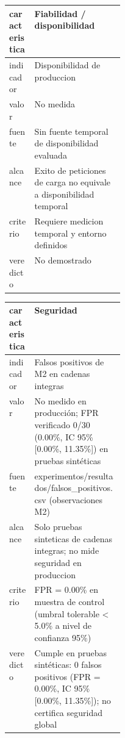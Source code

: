 \par\medskip
\begin{tabularx}{\linewidth}{|p{0.22\linewidth}|X|}
\hline
caracteristica & Fiabilidad / disponibilidad \\ \hline
indicador & Disponibilidad de produccion \\ \hline
valor & No medida \\ \hline
fuente & Sin fuente temporal de disponibilidad evaluada \\ \hline
alcance & Exito de peticiones de carga no equivale a disponibilidad temporal \\ \hline
criterio & Requiere medicion temporal y entorno definidos \\ \hline
veredicto & No demostrado \\ \hline
\end{tabularx}
\par\medskip
\begin{tabularx}{\linewidth}{|p{0.22\linewidth}|X|}
\hline
caracteristica & Seguridad \\ \hline
indicador & Falsos positivos de M2 en cadenas integras \\ \hline
valor & No medido en producción; FPR verificado 0/30 (0.00\%, IC 95\% [0.00\%, 11.35\%]) en pruebas sintéticas \\ \hline
fuente & experimentos/resultados/falsos\_positivos.csv (observaciones M2) \\ \hline
alcance & Solo pruebas sinteticas de cadenas integras; no mide seguridad en produccion \\ \hline
criterio & FPR = 0.00\% en muestra de control (umbral tolerable \textless{} 5.0\% a nivel de confianza 95\%) \\ \hline
veredicto & Cumple en pruebas sintéticas: 0 falsos positivos (FPR = 0.00\%, IC 95\% [0.00\%, 11.35\%]); no certifica seguridad global \\ \hline
\end{tabularx}
\par\medskip
